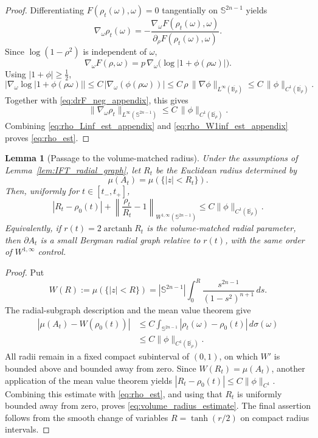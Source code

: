 \documentclass[11pt]{amsart}
\theoremstyle{plain}
\newtheorem{lemma}[theorem]{Lemma}
\theoremstyle{definition}
\theoremstyle{remark}
\newcommand{\B}{\mathbb{B}}
\newcommand{\Sn}{\mathbb{S}^{2n-1}}
\begin{document}
\begin{proof}
Differentiating \(F(\rho_t(\omega),\omega)=0\) tangentially on \(\Sn\) yields
\[
\nabla_\omega \rho_t(\omega)
=
-\frac{\nabla_\omega F(\rho_t(\omega),\omega)}{\partial_\rho F(\rho_t(\omega),\omega)}.
\]
Since \(\log(1-\rho^2)\) is independent of \(\omega\),
\[
\nabla_\omega F(\rho,\omega)
=
p\,\nabla_\omega\bigl(\log|1+\phi(\rho\omega)|\bigr).
\]
Using \(|1+\phi|\ge \frac12\),
\[
\bigl|\nabla_\omega\log|1+\phi(\rho\omega)|\bigr|
\le
C\,|\nabla_\omega(\phi(\rho\omega))|
\le
C\,\rho\,\|\nabla\phi\|_{L^\infty(\overline{\B_\rho})}
\le
C\,\|\phi\|_{C^1(\overline{\B_\rho})}.
\]
Together with \eqref{eq:drF_neg_appendix}, this gives
\begin{equation}\label{eq:rho_W1inf_est_appendix}
\|\nabla_\omega \rho_t\|_{L^\infty(\Sn)}
\le
C\,\|\phi\|_{C^1(\overline{\B_\rho})}.
\end{equation}
Combining \eqref{eq:rho_Linf_est_appendix} and \eqref{eq:rho_W1inf_est_appendix} proves \eqref{eq:rho_est}.
\end{proof}

\begin{lemma}[Passage to the volume-matched radius]
\label{lem:volume_matched_radius}
Under the assumptions of Lemma~\ref{lem:IFT_radial_graph}, let $R_t$ be the
Euclidean radius determined by
\[
 \mu(A_t)=\mu(\{|z|<R_t\}).
\]
Then, uniformly for $t\in[t_-,t_+]$,
\begin{equation}\label{eq:volume_radius_estimate}
 |R_t-\rho_0(t)|
 +\left\|\frac{\rho_t}{R_t}-1\right\|_{W^{1,\infty}(\Sn)}
 \le C\|\phi\|_{C^1(\overline{\B_\rho})}.
\end{equation}
Equivalently, if $r(t)=2\operatorname{arctanh}R_t$ is the volume-matched
radial parameter, then $\partial A_t$ is a small Bergman radial graph relative
to $r(t)$, with the same order of $W^{1,\infty}$ control.
\end{lemma}

\begin{proof}
Put
\[
 W(R):=\mu(\{|z|<R\})
 =|\Sn|\int_0^R\frac{s^{2n-1}}{(1-s^2)^{n+1}}\,ds.
\]
The radial-subgraph description and the mean value theorem give
\begin{align*}
 |\mu(A_t)-W(\rho_0(t))|
 &\le C\int_{\Sn}|\rho_t(\omega)-\rho_0(t)|\,d\sigma(\omega)\\
 &\le C\|\phi\|_{C^1(\overline{\B_\rho})}.
\end{align*}
All radii remain in a fixed compact subinterval of $(0,1)$, on which
$W'$ is bounded above and bounded away from zero. Since
$W(R_t)=\mu(A_t)$, another application of the mean value theorem yields
$|R_t-\rho_0(t)|\le C\|\phi\|_{C^1}$. Combining this estimate with
\eqref{eq:rho_est}, and using that $R_t$ is uniformly bounded away from zero,
proves \eqref{eq:volume_radius_estimate}. The final assertion follows from
the smooth change of variables $R=\tanh(r/2)$ on compact radius intervals.
\end{proof}
\end{document}
